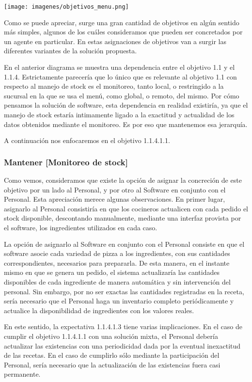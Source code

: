 \documentclass[a4paper,10pt]{article}
\begin{document}
\texttt{[image: imagenes/objetivos\_menu.png]}

Como se puede apreciar, surge una gran cantidad de objetivos en algún sentido más simples, algunos de los cuáles consideramos que pueden ser concretados por un agente en particular. En estas asignaciones de objetivos van a surgir las diferentes variantes de la solución propuesta. 

En el anterior diagrama se muestra una dependencia entre el objetivo 1.1 y el 1.1.4. Estrictamente parecería que lo único que es relevante al objetivo 1.1 con respecto al manejo de stock es el monitoreo, tanto local, o restringido a la sucursal en la que se usa el menú, como global, o remoto, del mismo. Por cómo pensamos la solución de software, esta dependencia en realidad existiría, ya que el manejo de stock estaría intimamente ligado a la exactitud y actualidad de los datos obtenidos mediante el monitoreo. Es por eso que mantenemos esa jerarquía.


A continuación nos enfocaremos en el objetivo 1.1.4.1.1. 
\subsubsection*{Mantener [Monitoreo de stock]}
Como vemos, consideramos que existe la opción de asignar la concreción de este objetivo por un lado al Personal, y por otro al Software en conjunto con el Personal. Esta apreciación merece algunas observaciones.
En primer lugar, asignarlo al Personal consistiría en que los cocineros actualicen con cada pedido el stock disponible, descontando manualmente, mediante una interfaz provista por el software, los ingredientes utilizados en cada caso.  


La opción de asignarlo al Software en conjunto con el Personal consiste en que el software asocie cada variedad de pizza a los ingredientes, con sus cantidades correspondientes, necesarios para prepararla. De esta manera, en el instante mismo en que se genera un pedido, el sistema actualizaría las cantidades disponibles de cada ingrediente de manera automática y sin intervención del personal. Sin embargo, por no ser exactas las cantidades registradas en la receta, sería necesario que el Personal haga un inventario completo periódicamente y actualice la disponibilidad de ingredientes con los valores reales.

En este sentido, la expectativa 1.1.4.1.3 tiene varias implicaciones. En el caso de cumplir el objetivo 1.1.4.1.1 con una solución mixta, el Personal debería actualizar las existencias con una periodicidad dada por la eventual inexactitud de las recetas. En el caso de cumplirlo sólo mediante la participación del Personal, sería necesario que la actualización de las existencias fuera casi permanente.
\end{document}
